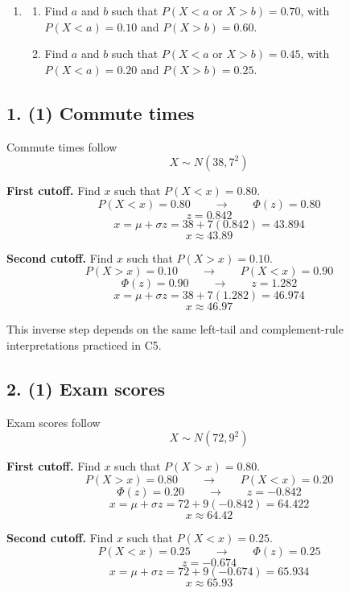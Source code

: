 \begin{enumerate}[label=\textbf{\arabic*)}]
		\item {}
		\begin{enumerate}[label=\textbf{\alph*)}]
			\item Find \(a\) and \(b\) such that \(P(X<a\text{ or }X>b)=0.70\), with \(P(X<a)=0.10\) and \(P(X>b)=0.60\).
			\item Find \(a\) and \(b\) such that \(P(X<a\text{ or }X>b)=0.45\), with \(P(X<a)=0.20\) and \(P(X>b)=0.25\).
		\end{enumerate}
	\end{enumerate}
	
	
	\subsection*{1. (1) Commute times}
	\label{subsec:inverse-normal-problems-c7-1}
	Commute times follow
	\[
	X\sim N(38,7^2)
	\]
	
	\textbf{First cutoff.} Find \(x\) such that \(P(X<x)=0.80\).
	\[
	P(X<x)=0.80
	\qquad \longrightarrow \qquad
	\Phi(z)=0.80
	\]
	\[
	z=0.842
	\]
	\[
	x=\mu+\sigma z
	=38+7(0.842)
	=43.894
	\]
	\[
	x\approx 43.89
	\]
	
	\textbf{Second cutoff.} Find \(x\) such that \(P(X>x)=0.10\).
	\[
	P(X>x)=0.10
	\qquad \longrightarrow \qquad
	P(X<x)=0.90
	\]
	\[
	\Phi(z)=0.90
	\qquad \longrightarrow \qquad
	z=1.282
	\]
	\[
	x=\mu+\sigma z
	=38+7(1.282)
	=46.974
	\]
	\[
	x\approx 46.97
	\]
	
	This inverse step depends on the same left-tail and complement-rule interpretations practiced in C5.
	
	
	\subsection*{2. (1) Exam scores}
	\label{subsec:inverse-normal-problems-c7-2}
	Exam scores follow
	\[
	X\sim N(72,9^2)
	\]
	
	\textbf{First cutoff.} Find \(x\) such that \(P(X>x)=0.80\).
	\[
	P(X>x)=0.80
	\qquad \longrightarrow \qquad
	P(X<x)=0.20
	\]
	\[
	\Phi(z)=0.20
	\qquad \longrightarrow \qquad
	z=-0.842
	\]
	\[
	x=\mu+\sigma z
	=72+9(-0.842)
	=64.422
	\]
	\[
	x\approx 64.42
	\]
	
	\textbf{Second cutoff.} Find \(x\) such that \(P(X<x)=0.25\).
	\[
	P(X<x)=0.25
	\qquad \longrightarrow \qquad
	\Phi(z)=0.25
	\]
	\[
	z=-0.674
	\]
	\[
	x=\mu+\sigma z
	=72+9(-0.674)
	=65.934
	\]
	\[
	x\approx 65.93
	\]
	

